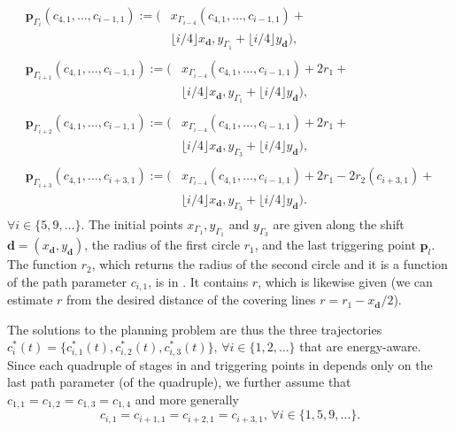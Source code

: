 \begin{subequations}\label{eq:ex-pb-trigs}\begin{align}
  \begin{split}
  \mathbf{p}_{\Gamma_i}(c_{4,1},\dots,c_{i-1,1}):=(&x_{\Gamma_{i-4}}(c_{4,1},\dots,c_{i-1,1})+\\
  &\lfloor i/4\rfloor x_\mathbf{d},y_{\Gamma_1}+\lfloor i/4\rfloor y_\mathbf{d}),\end{split}\\
  \begin{split}
  \mathbf{p}_{\Gamma_{i+1}}(c_{4,1},\dots,c_{i-1,1}):=(&x_{\Gamma_{i-4}}(c_{4,1},\dots,c_{i-1,1})+2r_1+\\
  &\lfloor i/4\rfloor x_\mathbf{d},y_{\Gamma_1}+\lfloor i/4\rfloor y_\mathbf{d}),\end{split}\\
  \begin{split}
  \mathbf{p}_{\Gamma_{i+2}}(c_{4,1},\dots,c_{i-1,1}):=(&x_{\Gamma_{i-4}}(c_{4,1},\dots,c_{i-1,1})+2r_1+\\
  &\lfloor i/4\rfloor x_\mathbf{d},y_{\Gamma_3}+\lfloor i/4\rfloor y_\mathbf{d}),\end{split}\\
  \begin{split}
  \mathbf{p}_{\Gamma_{i+3}}(c_{4,1},\dots,c_{i+3,1}):=(&x_{\Gamma_{i-4}}(c_{4,1},\dots,c_{i-1,1})+2r_1-2r_2(c_{i+3,1})+\\
  &\lfloor i/4\rfloor x_\mathbf{d},y_{\Gamma_3}+\lfloor i/4\rfloor y_\mathbf{d}).\end{split}
\end{align}
\end{subequations}
$\forall i\in\{5,9,\dots\}$. The initial points $x_{\Gamma_1},y_{\Gamma_1}$ and $y_{\Gamma_3}$ are given along the shift $\mathbf{d}=(x_\mathbf{d},y_\mathbf{d})$, the radius of the first circle $r_1$, and the last triggering point $\mathbf{p}_l$. The function $r_2$, which returns the radius of the second circle and it is a function of the path parameter $c_{i,1}$, is in . It contains $r$, which is likewise given (we can estimate $r$ from the desired distance of the covering lines $r=r_1-x_\mathbf{d}/2$).

The solutions to the planning problem are thus the three trajectories $c_i^*(t)=\{c_{i,1}^*(t),c_{i,2}^*(t),c_{i,3}^*(t)\},\,\forall i\in\{1,2,\dots\}$ that are energy-aware. 
Since each quadruple of stages in  and triggering points in  depends only on the last path parameter (of the quadruple), we further assume that $c_{1,1}=c_{1,2}=c_{1,3}=c_{1,4}$ and more generally 
\begin{equation}
c_{i,1}=c_{i+1,1}=c_{i+2,1}=c_{i+3,1},\,\forall i\in\{1,5,9,\dots\}.
\end{equation}

